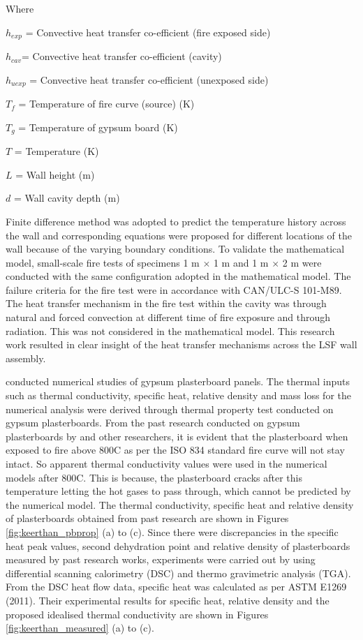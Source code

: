 Where
\begin{description}[itemsep=0pt,parsep=0pt]
	\item $ h_{exp} $ = Convective heat transfer co-efficient (fire exposed side)
	\item $ h_{cav} $= Convective heat transfer co-efficient (cavity) 
	\item $ h_{u exp} $ = Convective heat transfer co-efficient (unexposed side) 
	\item $ T_f $ = Temperature of fire curve (source) (\degree K)
	\item $ T_g $ = Temperature of gypsum board (\degree K)
	\item $T$ = Temperature (\degree K)
	\item $L$ = Wall height (m)
	\item $d$ = Wall cavity depth (m)
\end{description}
Finite difference method was adopted to predict the temperature history across the wall and corresponding equations were proposed for different locations of the wall because of the varying boundary conditions. To validate the mathematical model, small-scale fire tests of specimens 1 m $\times$ 1 m and 1 m $\times$ 2 m were conducted with the same configuration adopted in the mathematical model. The failure criteria for the fire test were in accordance with CAN/ULC-S 101-M89. The heat transfer mechanism in the fire test within the cavity was through natural and forced convection at different time of fire exposure and through radiation. This was not considered in the mathematical model. This research work resulted in clear insight of the heat transfer mechanisms across the LSF wall assembly. 

\citet{Keerthan2012a} conducted numerical studies of gypsum plasterboard panels. The thermal inputs such as thermal conductivity, specific heat, relative density and mass loss for the numerical analysis were derived through thermal property test conducted on gypsum plasterboards. From the past research conducted on gypsum plasterboards by \citet{Mehaffey1994,Sultan1996} and other researchers, it is evident that the plasterboard when exposed to fire above 800\degree C as per the ISO 834 standard fire curve will not stay intact. So apparent thermal conductivity values were used in the numerical models after 800\degree C. This is because, the plasterboard cracks after this temperature letting the hot gases to pass through, which cannot be predicted by the numerical model. The thermal conductivity, specific heat and relative density of plasterboards obtained from past research are shown in Figures \ref{fig:keerthan_pbprop} (a) to (c). Since there were discrepancies in the specific heat peak values, second dehydration point and relative density of plasterboards measured by past research works, experiments were carried out by \citet{Keerthan2012} using differential scanning calorimetry (DSC) and thermo gravimetric analysis (TGA). From the DSC heat flow data, specific heat was calculated as per ASTM E1269 (2011). Their experimental results for specific heat, relative density and the proposed idealised thermal conductivity are shown in Figures \ref{fig:keerthan_measured} (a) to (c).

